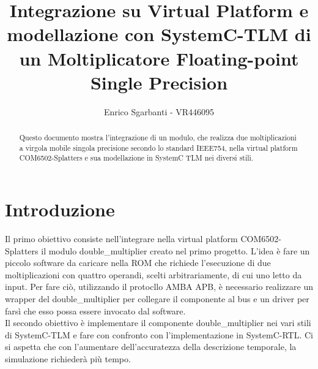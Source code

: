 \documentclass[]{IEEEtran}
\title{Integrazione su Virtual Platform e modellazione con SystemC-TLM di un Moltiplicatore Floating-point Single Precision}
\author{Enrico Sgarbanti - VR446095}
\begin{document}
\maketitle



\begin{abstract}
    Questo documento mostra l'integrazione di un modulo, che realizza due moltiplicazioni a virgola mobile singola precisione secondo lo standard IEEE754\cite{IEEE754}, nella virtual platform COM6502-Splatters e sua modellazione in SystemC\cite{SystemC} TLM nei diversi stili.
\end{abstract}



\section{Introduzione}
Il primo obiettivo consiste nell'integrare nella virtual platform COM6502-Splatters il modulo double\_multiplier creato nel primo progetto. L'idea è fare un piccolo software da caricare nella ROM che richiede l'esecuzione di due moltiplicazioni con quattro operandi, scelti arbitrariamente, di cui uno letto da input. Per fare ciò, utilizzando il protocllo AMBA APB, è necessario realizzare un wrapper del double\_multiplier per collegare il componente al bus e un driver per farsì che esso possa essere invocato dal software.
\\Il secondo obiettivo è implementare il componente double\_multiplier nei vari stili di SystemC-TLM e fare con confronto con l'implementazione in SystemC-RTL. Ci si aspetta che con l'aumentare dell'accuratezza della descrizione temporale, la simulazione richiederà più tempo.
\end{document}
